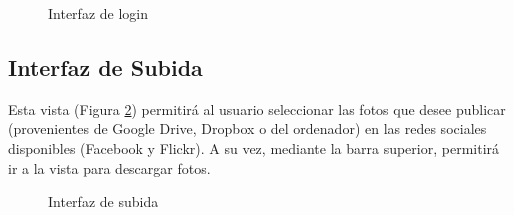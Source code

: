 \documentclass{scrartcl}
\begin{document}
\begin{figure}[H]
	
	\centering
	\caption{Interfaz de login}
	\label{fig:VistaLogin}
	
\end{figure}

\vspace*{2in}
\subsection{Interfaz de Subida}
Esta vista (Figura \ref{fig:VistaSubida}) permitirá al usuario seleccionar las fotos que desee publicar (provenientes de Google Drive, Dropbox o del ordenador) en las redes sociales disponibles (Facebook y Flickr). A su vez, mediante la barra superior, permitirá ir a la vista para descargar fotos.
\begin{figure}[H]
	
	\centering
	\caption{Interfaz de subida}
	\label{fig:VistaSubida}
	
\end{figure}
\vspace*{2in}
\end{document}
